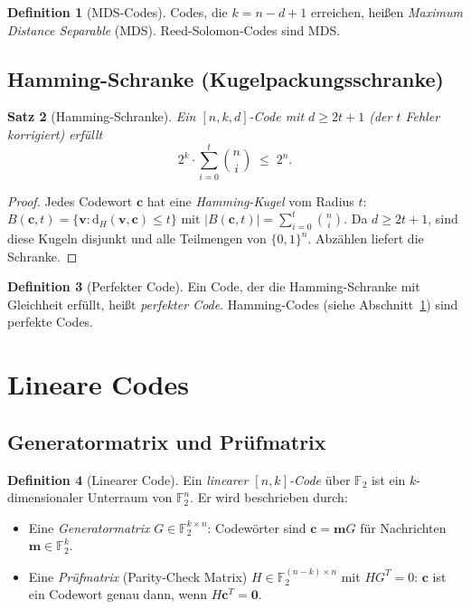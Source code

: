 \documentclass[12pt,a4paper]{amsart}
\newtheorem{theorem}{Satz}[section]
\theoremstyle{definition}
\newtheorem{definition}[theorem]{Definition}
\theoremstyle{remark}
\newcommand{\dist}{\mathrm{d}}
\begin{document}
\begin{definition}[MDS-Codes]
Codes, die $k = n - d + 1$ erreichen, heißen \emph{Maximum Distance Separable}
(MDS). Reed-Solomon-Codes sind MDS.
\end{definition}

\subsection{Hamming-Schranke (Kugelpackungsschranke)}

\begin{theorem}[Hamming-Schranke]\label{satz:hamming-schranke}
Ein $[n,k,d]$-Code mit $d \geq 2t+1$ (der $t$ Fehler korrigiert) erfüllt
\[
  2^k \cdot \sum_{i=0}^{t}\binom{n}{i} \;\leq\; 2^n.
\]
\end{theorem}
\begin{proof}
Jedes Codewort $\mathbf{c}$ hat eine \emph{Hamming-Kugel} vom Radius $t$:
$B(\mathbf{c}, t) = \{\mathbf{v} : \dist_H(\mathbf{v},\mathbf{c}) \leq t\}$
mit $|B(\mathbf{c},t)| = \sum_{i=0}^t \binom{n}{i}$. Da $d \geq 2t+1$, sind
diese Kugeln disjunkt und alle Teilmengen von $\{0,1\}^n$. Abzählen liefert
die Schranke.
\end{proof}

\begin{definition}[Perfekter Code]
Ein Code, der die Hamming-Schranke mit Gleichheit erfüllt, heißt
\emph{perfekter Code}. Hamming-Codes (siehe Abschnitt~\ref{sec:linear-de})
sind perfekte Codes.
\end{definition}

\section{Lineare Codes}\label{sec:linear-de}

\subsection{Generatormatrix und Prüfmatrix}

\begin{definition}[Linearer Code]
Ein \emph{linearer $[n,k]$-Code} über $\mathbb{F}_2$ ist ein $k$-dimensionaler
Unterraum von $\mathbb{F}_2^n$. Er wird beschrieben durch:
\begin{itemize}
  \item Eine \emph{Generatormatrix} $G \in \mathbb{F}_2^{k \times n}$: Codewörter
        sind $\mathbf{c} = \mathbf{m} G$ für Nachrichten $\mathbf{m} \in \mathbb{F}_2^k$.
  \item Eine \emph{Prüfmatrix} (Parity-Check Matrix) $H \in \mathbb{F}_2^{(n-k)
        \times n}$ mit $H G^T = 0$: $\mathbf{c}$ ist ein Codewort genau dann, wenn
        $H \mathbf{c}^T = \mathbf{0}$.
\end{itemize}
\end{definition}
\end{document}
